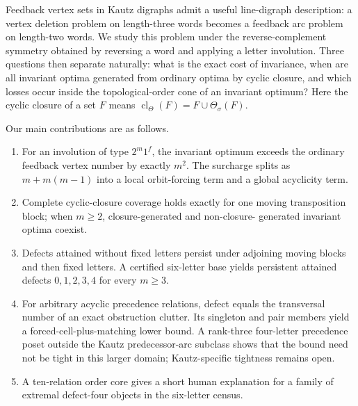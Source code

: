\documentclass[11pt,a4paper]{article}
\theoremstyle{remark}
\newcommand{\cl}{\operatorname{cl}}
\begin{document}
Feedback vertex sets in Kautz digraphs admit a useful line-digraph
description: a vertex deletion problem on length-three words becomes a
feedback arc problem on length-two words.  We study this problem under the
reverse-complement symmetry obtained by reversing a word and applying a
letter involution.  Three questions then separate naturally: what is the
exact cost of invariance, when are all invariant optima generated from
ordinary optima by cyclic closure, and which losses occur inside the
topological-order cone of an invariant optimum?  Here the cyclic closure of
a set \(F\) means \(\cl_{\Theta}(F)=F\cup\Theta_\sigma(F)\).

Our main contributions are as follows.
\begin{enumerate}[leftmargin=*]
\item For an involution of type \(2^m1^f\), the invariant optimum exceeds the
ordinary feedback vertex number by exactly \(m^2\).  The surcharge splits as
\(m+m(m-1)\) into a local orbit-forcing term and a global acyclicity term.
\item Complete cyclic-closure coverage holds exactly for one moving
transposition block; when \(m\geq2\), closure-generated and non-closure-
generated invariant optima coexist.
\item Defects attained without fixed letters persist under adjoining moving
blocks and then fixed letters.  A certified six-letter base yields persistent attained
defects \(0,1,2,3,4\) for every \(m\geq3\).
\item For arbitrary acyclic precedence relations, defect equals the
transversal number of an exact obstruction clutter.  Its singleton and pair
members yield a forced-cell-plus-matching lower bound.  A rank-three
four-letter precedence poset outside the Kautz predecessor-arc subclass shows
that the bound need not be tight in this larger domain; Kautz-specific
tightness remains open.
\item A ten-relation order core gives a short human explanation for a family
of extremal defect-four objects in the six-letter census.
\end{enumerate}
\end{document}
